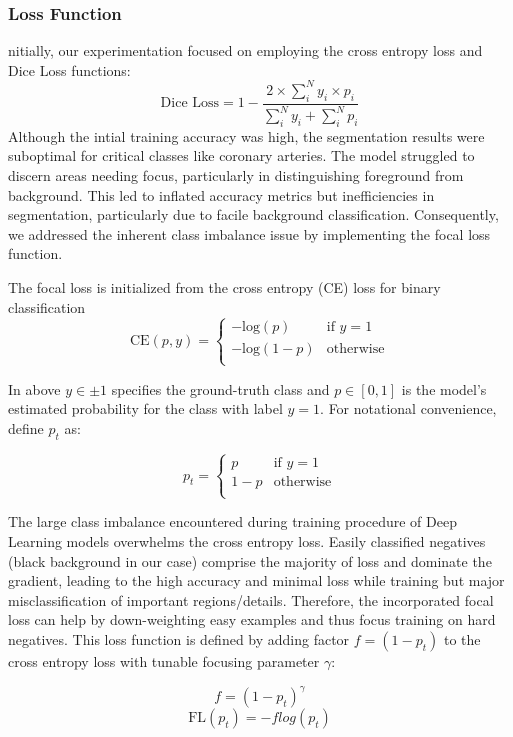 \documentclass{article}
\begin{document}
\begin{multicols}{2}
\subsubsection{Loss Function}
nitially, our experimentation focused on employing the cross entropy loss and Dice Loss functions:
$$ \text{Dice Loss} = 1 - \frac{{2 \times \sum_{i}^{N} y_i \times p_i}}{{\sum_{i}^{N} y_i + \sum_{i}^{N} p_i}} $$
Although the intial training accuracy was high, the segmentation results were suboptimal for critical classes like coronary arteries. The model struggled to discern areas needing focus, particularly in distinguishing foreground from background. This led to inflated accuracy metrics but inefficiencies in segmentation, particularly due to facile background classification. Consequently, we addressed the inherent class imbalance issue by implementing the focal loss  function.

The focal loss is initialized from the cross entropy (CE) loss for binary classification
$$
\text{CE}(p,y) = 
\left\{
\begin{array}{ll}
    -\text{log}(p) & \text{if } y=1 \\
    -\text{log}(1-p) & \text{otherwise} \\
\end{array}
\right.
$$

In above $y \in {\pm 1}$ specifies the ground-truth class and $p \in [0,1]$ is the model's estimated probability for the class with label $y=1$. For notational convenience, \cite{focal} define $p_t$ as:

$$
p_t = 
\left\{
\begin{array}{ll}
    p & \text{if } y=1 \\
    1 - p & \text{otherwise} \\
\end{array}
\right.
$$

The large class imbalance encountered during training procedure of Deep Learning models overwhelms the cross entropy loss. Easily classified negatives (black background in our case) comprise the majority of loss and dominate the gradient, leading to the high accuracy and minimal loss while training but major misclassification of important regions/details. Therefore, the incorporated focal loss can help by down-weighting easy examples and thus focus training on hard negatives. This loss function is defined by adding factor $f=(1-p_t)$ to the cross entropy loss with tunable focusing parameter $\gamma$:


$$   f = (1-p_t)^{\gamma} $$
$$  \text{FL}(p_t) = -f log(p_t) $$



\end{multicols}
\end{document}
